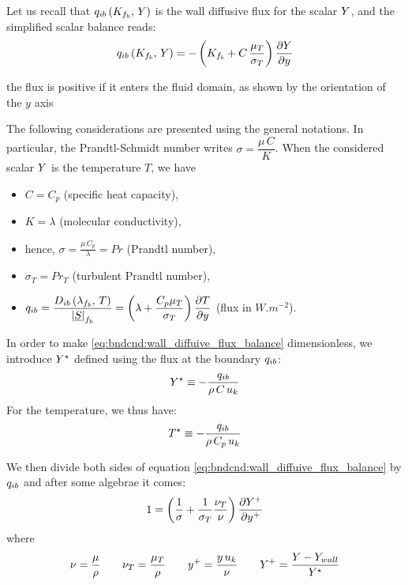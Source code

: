  Let us recall that $q_{ib} \left( K_{f_{b}} , \, Y \right) $ is the wall diffusive flux for the scalar $Y$,
 and the simplified scalar balance reads:
\begin{equation}\label{eq:bndcnd:wall_diffuive_flux_balance}
q_{ib} \left( K_{f_{b}} , \, Y \right)  =
-\left(K_{f_{b}} + C\,\frac{\mu_T}{\sigma_T}\right)
                  \dfrac{\partial Y}{\partial y}
\end{equation}

\begin{remark}
the flux is positive
if it enters the fluid domain, as shown by the orientation of the
$y$ axis
\end{remark}

The following considerations are presented using the general notations.
In particular, the Prandtl-Schmidt number writes
$\sigma=\displaystyle\dfrac{\mu \,C}{K}$.
When the considered scalar $Y$ is the temperature $T$,
we have
\begin{itemize}
\item $C=C_p$ (specific heat capacity),
\item $K=\lambda$ (molecular conductivity),
\item hence, $\sigma = \displaystyle\frac{\mu \,C_p}{\lambda} = Pr$
       (Prandtl number),
\item $\sigma_T = Pr_T$ (turbulent Prandtl number),
\item $q_{ib} = \dfrac{D_{ib} \left( \lambda_{f_{b}} , \, T \right)}{\left| \underline{S} \right|_{f_{b}}} =\left(\lambda+\displaystyle\frac{C_p \mu_T}{\sigma_T}\right)
        \displaystyle \dfrac{\partial T}{\partial y}$ (flux in $W.m^{-2}$).
\end{itemize}


In order to make \eqref{eq:bndcnd:wall_diffuive_flux_balance} dimensionless,
we introduce $Y^\star$ defined using
the flux at the boundary  $q_{ib}$:
\begin{equation}\label{eq:bndcnd:def_varia_star}
Y^\star \equiv -\displaystyle \dfrac{q_{ib}}{\rho\,C\,u_k}
\end{equation}
For the temperature, we thus have:
\begin{equation}\label{eq:bndcnd:def_T_star}
T^\star \equiv -\displaystyle\frac{q_{ib}}{\rho\,C_p\,u_k}
\end{equation}

We then divide both sides of equation \eqref{eq:bndcnd:wall_diffuive_flux_balance}
by $q_{ib}$ and after some algebrae it comes:
\begin{equation}\label{eq:bndcnd:scalar_flux_adim}
1 =  \left(\displaystyle\frac{1}{\sigma}+
              \displaystyle\frac{1}{\sigma_T}\dfrac{\nu_T}{\nu}\right)
                  \displaystyle\dfrac{\partial Y^+}{\partial y^+}
\end{equation}
%
where
\begin{equation}
       \nu=\displaystyle \dfrac{\mu}{\rho}
\qquad \nu_T=\displaystyle\dfrac{\mu_T}{\rho}
\qquad y^+=\displaystyle\dfrac{y\,u_k}{\nu}
\qquad Y^+=\displaystyle \dfrac{Y-Y_{wall}}{Y^\star}
\end{equation}


